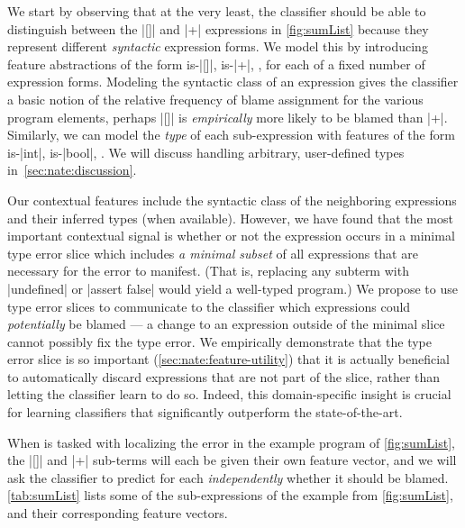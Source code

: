 %
We start by observing that
at the very least, the
classifier should be able
to distinguish between the
|[]| and |+| expressions
in \autoref{fig:sumList}
because they represent
different \emph{syntactic}
expression forms.
%
We model this by
introducing feature
abstractions of the form
is-|[]|, is-|+|, \etc, for
each of a fixed number of
expression forms.
%
Modeling the syntactic class of an
expression gives the classifier a
basic notion of the relative
frequency of blame assignment
for the various program elements,
\ie perhaps |[]| is
\emph{empirically} more
likely to be blamed than |+|.
%
Similarly, we can model
the \emph{type} of each
sub-expression with features
of the form is-|int|, is-|bool|, \etc.
%
We will discuss handling
arbitrary, user-defined types
in~\autoref{sec:nate:discussion}.

%
Our contextual features include the
syntactic class of the neighboring
expressions and their inferred types
(when available).
%
However, we have found that
the most important contextual
signal is whether or not the
expression occurs in
a minimal type error slice
\citep{Tip2001-qp,Haack2003-vc}
which includes \emph{a minimal subset}
of all expressions that are
necessary for the error to manifest.
%
(That is, replacing any subterm
with |undefined| or |assert false|
would yield a well-typed program.)
%
We propose to use type error slices
to communicate to the classifier
which expressions could
\emph{potentially} be blamed --- a
change to an expression outside of
the minimal slice cannot possibly
fix the type error.
%
We empirically demonstrate that
the type error slice is so
important (\autoref{sec:nate:feature-utility})
that it is actually beneficial to
automatically discard expressions
that are not part of the slice,
rather than letting the classifier
learn to do so.
%
Indeed, this domain-specific
insight is crucial for learning
classifiers that significantly
outperform the state-of-the-art.

%
When \toolname is tasked with localizing
the error in the example program of \autoref{fig:sumList},
the |[]| and |+| sub-terms will each be given
their own feature vector, and we will ask the
classifier to predict for each \emph{independently}
whether it should be blamed.
%
\autoref{tab:sumList} lists some
of the sub-expressions of the example
from \autoref{fig:sumList}, and their
corresponding feature vectors.




